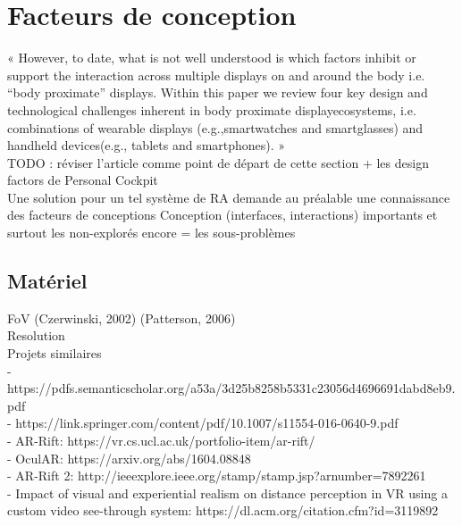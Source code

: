 \section{Facteurs de conception}
« However, to date, what is not well understood is which factors inhibit or support the interaction across multiple displays on and around the body i.e. “body proximate” displays. Within this paper we review four key design and technological challenges inherent in body proximate displayecosystems, i.e. combinations of wearable displays (e.g.,smartwatches and smartglasses) and handheld devices(e.g., tablets and smartphones). » \cite{GrubertKranzQuigley2015}\\
TODO : réviser l'article comme point de départ de cette section + les design factors de Personal Cockpit\\

Une solution pour un tel système de RA demande au préalable une connaissance des facteurs de conceptions
Conception (interfaces, interactions) importants et surtout les non-explorés encore = les sous-problèmes


\subsection{Matériel}
        FoV (Czerwinski, 2002) (Patterson, 2006) \cite{KishishitaKiyokawaOrloskyEtAl2014}\\

        Resolution\\

        Projets similaires\\
        - https://pdfs.semanticscholar.org/a53a/3d25b8258b5331c23056d4696691dabd8eb9.pdf\\
        - https://link.springer.com/content/pdf/10.1007/s11554-016-0640-9.pdf\\
        - AR-Rift: https://vr.cs.ucl.ac.uk/portfolio-item/ar-rift/\\
        - OculAR: https://arxiv.org/abs/1604.08848\\
        - AR-Rift 2: http://ieeexplore.ieee.org/stamp/stamp.jsp?arnumber=7892261\\
        - Impact of visual and experiential realism on distance perception in VR using a custom video see-through system: https://dl.acm.org/citation.cfm?id=3119892


